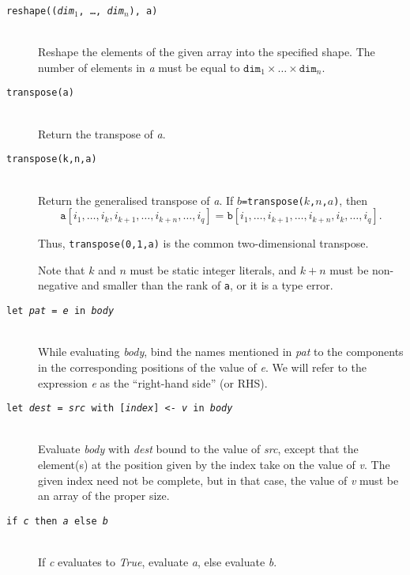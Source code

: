\begin{description}
  \item[\texttt{reshape((\textit{dim}$_{1}$, \ldots, \textit{dim}$_{n}$), a)}]\hfill\\
    Reshape the elements of the given array into the specified shape.
    The number of elements in \textit{a} must be equal to
    $\texttt{dim}_{1}\times\ldots\times\texttt{dim}_{n}$.

  \item[\texttt{transpose(a)}]\hfill\\
    Return the transpose of \textit{a}.

  \item[\texttt{transpose(k,n,a)}]\hfill\\
    Return the generalised transpose of \textit{a}.  If
    \texttt{$b$=transpose($k$,$n$,$a$)}, then
    \[
    \texttt{a}[i_1, \ldots, i_k, i_{k+1}, \ldots, i_{k+n}, \ldots, i_q ]
    =
    \texttt{b}[i_1 , \ldots, i_{k+1} , \ldots, i_{k+n}, i_k, \ldots, i_q ].
    \]

    Thus, \texttt{transpose(0,1,a)} is the common two-dimensional
    transpose.

    Note that $k$ and $n$ must be static integer literals, and $k+n$
    must be non-negative and smaller than the rank of \texttt{a}, or
    it is a type error.

  \item[\texttt{let \textit{pat} = \textit{e} in \textit{body}}]\hfill\\
    While evaluating \textit{body}, bind the names mentioned in
    \textit{pat} to the components in the corresponding positions of
    the value of \textit{e}.  We will refer to the expression
    \textit{e} as the ``right-hand side'' (or RHS).

  \item[\texttt{let \textit{dest} = \textit{src} with [\textit{index}] <- \textit{v} in \textit{body}}] \hfill \\
    Evaluate \textit{body} with \textit{dest} bound to the value of
    \textit{src}, except that the element(s) at the position given by
    the index take on the value of \textit{v}.  The given index need
    not be complete, but in that case, the value of \textit{v} must be
    an array of the proper size.

  \item[\texttt{if \textit{c} then \textit{a} else \textit{b}}]\hfill\\
    If \textit{c} evaluates to \textit{True}, evaluate \textit{a},
    else evaluate \textit{b}.


\end{description}
